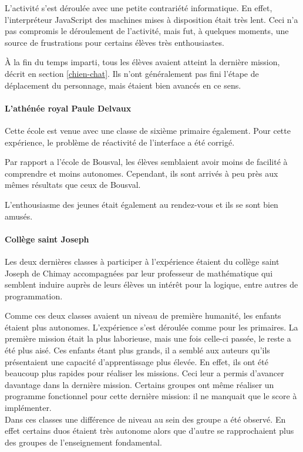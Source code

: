 L'activité s'est déroulée avec une petite contrariété informatique. En effet, l'interpréteur JavaScript des machines mises à disposition était très lent. Ceci n'a pas compromis le déroulement de l'activité, mais fut, à quelques moments, une source de frustrations pour certains élèves très enthousiastes.

À la fin du temps imparti, tous les élèves avaient atteint la dernière mission, décrit en section \ref{chien-chat}. Ils n'ont généralement pas fini l'étape de déplacement du personnage, mais étaient bien avancés en ce sens.

\paragraph{L'athénée royal Paule Delvaux}
Cette école est venue avec une classe de sixième primaire également. Pour cette expérience, le problème de réactivité de l'interface a été corrigé.

Par rapport a l'école de Bousval, les élèves semblaient avoir moins de facilité à comprendre et moins autonomes.
Cependant, ils sont arrivés à peu près aux mêmes résultats que ceux de Bousval.

L'enthousiasme des jeunes était également au rendez-vous et ils se sont bien amusés.

\paragraph{Collège saint Joseph}
Les deux dernières classes à participer à l'expérience étaient du collège saint Joseph de Chimay accompagnées par leur professeur de mathématique qui semblent induire auprès de leurs élèves un intérêt pour la logique, entre autres de programmation.

Comme ces deux classes avaient un niveau de première humanité, les enfants étaient plus autonomes. L'expérience s'est déroulée comme pour les primaires. La première mission était la plus laborieuse, mais une fois celle-ci passée, le reste a été plus aisé. Ces enfants étant plus grands, il a semblé aux auteurs qu'ils présentaient une capacité d'apprentissage plus élevée. En effet, ils ont été beaucoup plus rapides pour réaliser les missions. Ceci leur a permis d'avancer davantage dans la dernière mission. Certains groupes ont même réaliser un programme fonctionnel pour cette dernière mission: il ne manquait que le score à implémenter.\\

Dans ces classes une différence de niveau au sein des groupe a été observé. En effet certains duos étaient très autonome alors que d'autre se rapprochaient plus des groupes de l'enseignement fondamental.

